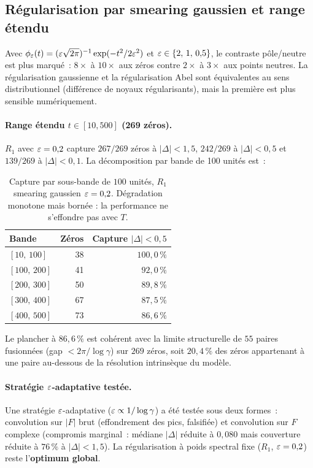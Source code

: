 \subsection{Régularisation par smearing gaussien et range étendu}
\label{sec:verif_smearing}

Avec $\phi_\varepsilon(t) = (\varepsilon \sqrt{2\pi})^{-1} \exp(-t^{2} / 2\varepsilon^{2})$ et
$\varepsilon \in \{2,\,1,\,0{,}5\}$, le contraste pôle/neutre est plus marqué~:
$8\times$ à $10\times$ aux zéros contre $2\times$ à $3\times$ aux points
neutres. La régularisation gaussienne et la régularisation Abel sont
équivalentes au sens distributionnel (différence de noyaux régularisants),
mais la première est plus sensible numériquement.

\paragraph{Range étendu $t \in [10, 500]$ (269 zéros).}
$R_1$ avec $\varepsilon = 0{,}2$ capture $267/269$ zéros à $|\Delta| < 1{,}5$,
$242/269$ à $|\Delta| < 0{,}5$ et $139/269$ à $|\Delta| < 0{,}1$. La
décomposition par bande de 100 unités est~:

\begin{table}[ht]
\centering
\begin{tabular}{@{}lrr@{}}
\toprule
\textbf{Bande} & \textbf{Zéros} & \textbf{Capture $|\Delta| < 0{,}5$}\\
\midrule
$[10,\,100]$ & 38 & $100{,}0\,\%$\\
$[100,\,200]$ & 41 & $92{,}0\,\%$\\
$[200,\,300]$ & 50 & $89{,}8\,\%$\\
$[300,\,400]$ & 67 & $87{,}5\,\%$\\
$[400,\,500]$ & 73 & $86{,}6\,\%$\\
\bottomrule
\end{tabular}
\caption{Capture par sous-bande de $100$ unités, $R_1$ smearing gaussien
$\varepsilon = 0{,}2$. Dégradation monotone mais bornée : la performance ne
s'effondre pas avec $T$.}
\label{tab:bandes}
\end{table}

Le plancher à $86{,}6\,\%$ est cohérent avec la limite structurelle de
$55$ paires fusionnées (gap $< 2\pi/\log\gamma$) sur $269$ zéros, soit
$20{,}4\,\%$ des zéros appartenant à une paire au-dessous de la
résolution intrinsèque du modèle.

\paragraph{Stratégie $\varepsilon$-adaptative testée.}
Une stratégie $\varepsilon$-adaptative ($\varepsilon \propto 1/\log\gamma$) a été
testée sous deux formes~: convolution sur $|F|$ brut (effondrement des
pics, falsifiée) et convolution sur $F$ complexe (compromis marginal~:
médiane $|\Delta|$ réduite à $0{,}080$ mais couverture réduite à
$76\,\%$ à $|\Delta| < 1{,}5$). La régularisation à poids spectral
fixe ($R_1$, $\varepsilon = 0{,}2$) reste l'\textbf{optimum global}.

